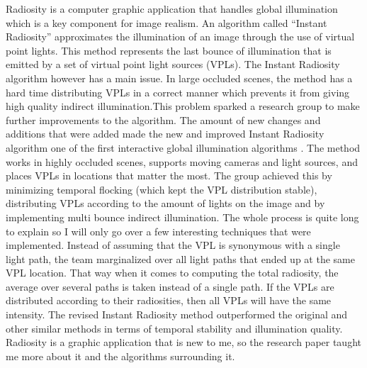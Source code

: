 \documentclass{article}
\begin{document}
Radiosity is a computer graphic application that handles global illumination which is a key component for image realism. An algorithm called “Instant Radiosity” approximates the illumination of an image through the use of virtual point lights. This method represents the last bounce of illumination that is emitted by a set of virtual point light sources (VPLs). The Instant Radiosity algorithm however has a main issue. In large occluded scenes, the method has a hard time distributing VPLs in a correct manner which prevents it from giving high quality indirect illumination.This problem sparked a research group to make further improvements to the algorithm. The amount of new changes and additions that were added made the new and improved Instant Radiosity algorithm one of the first interactive global illumination algorithms \cite{7867077}. The method works in highly occluded scenes, supports moving cameras and light sources, and places VPLs in locations that matter the most. The group achieved this by minimizing temporal flocking (which kept the VPL distribution stable), distributing VPLs according to the amount of lights on the image and by implementing multi bounce indirect illumination. The whole process is quite long to explain so I will only go over a few interesting techniques that were implemented. Instead of assuming that the VPL is synonymous with a single light path, the team marginalized over all light paths that ended up at the same VPL location. That way when it comes to computing the total radiosity, the average over several paths is taken instead of a single path. If the VPLs are distributed according to their radiosities, then all VPLs will have the same intensity. The revised Instant Radiosity method outperformed the original and other similar methods in terms of temporal stability and illumination quality. Radiosity is a graphic application that is new to me, so the research paper taught me more about it and the algorithms surrounding it.
\end{document}
